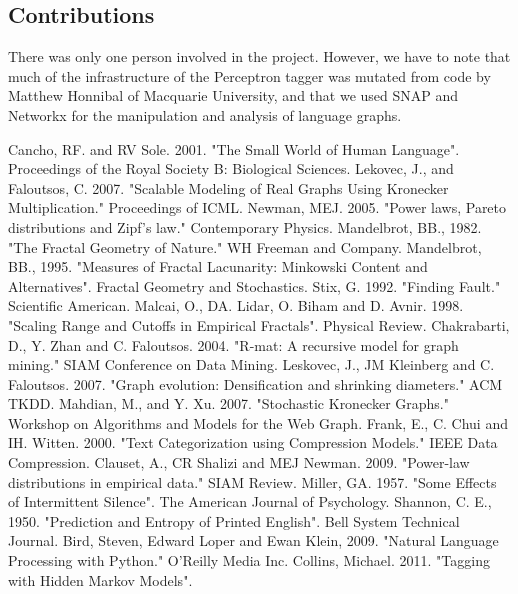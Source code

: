 \documentclass[12pt]{article}
\begin{document}

\subsection{Contributions}
There was only one person involved in the project. However, we have to note that much of the infrastructure of the Perceptron tagger was mutated from code by Matthew Honnibal of Macquarie University, and that we used SNAP and Networkx for the manipulation and analysis of language graphs. %


\begin{thebibliography}{99}
    Cancho, RF. and RV Sole. 2001. "The Small World of Human Language". Proceedings of the Royal Society B: Biological Sciences.
    Lekovec, J., and Faloutsos, C. 2007. "Scalable Modeling of Real Graphs Using Kronecker Multiplication." Proceedings of ICML.
    Newman, MEJ. 2005. "Power laws, Pareto distributions and Zipf's law." Contemporary Physics.
    Mandelbrot, BB., 1982. "The Fractal Geometry of Nature." WH Freeman and Company.
    Mandelbrot, BB., 1995. "Measures of Fractal Lacunarity: Minkowski Content and Alternatives". Fractal Geometry and Stochastics.
    Stix, G. 1992. "Finding Fault." Scientific American.
    Malcai, O., DA. Lidar, O. Biham and D. Avnir. 1998. "Scaling Range and Cutoffs in Empirical Fractals". Physical Review.
    Chakrabarti, D., Y. Zhan and C. Faloutsos. 2004. "R-mat: A recursive model for graph mining." SIAM Conference on Data Mining.
    Leskovec, J., JM Kleinberg and C. Faloutsos. 2007. "Graph evolution: Densification and shrinking diameters." ACM TKDD.
    Mahdian, M., and Y. Xu. 2007. "Stochastic Kronecker Graphs." Workshop on Algorithms and Models for the Web Graph.
    Frank, E., C. Chui and IH. Witten. 2000. "Text Categorization using Compression Models." IEEE Data Compression.
    Clauset, A., CR Shalizi and MEJ Newman. 2009. "Power-law distributions in empirical data." SIAM Review.
    Miller, GA. 1957. "Some Effects of Intermittent Silence". The American Journal of Psychology.
    Shannon, C. E., 1950. "Prediction and Entropy of Printed English". Bell System Technical Journal.
    Bird, Steven, Edward Loper and Ewan Klein, 2009. "Natural Language Processing with Python." O'Reilly Media Inc.
    Collins, Michael. 2011. "Tagging with Hidden Markov Models".
\end{thebibliography}
\end{document}
